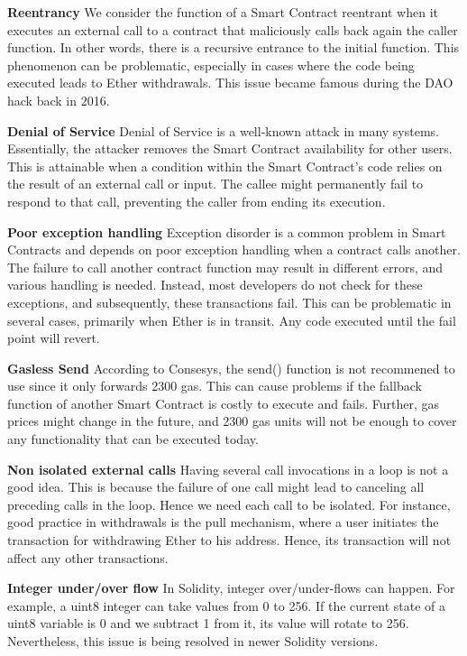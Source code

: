 \documentclass[a4paper,11pt]{article}
\begin{document}
\textbf{Reentrancy}
We consider the function of a Smart Contract reentrant when it executes an
external call to a contract that maliciously calls back again the caller
function. In other words, there is a recursive entrance to the initial function.
This phenomenon can be problematic, especially in cases where the code being
executed leads to Ether withdrawals. This issue became famous during the DAO\cite{dao}
hack back in 2016.

\textbf{Denial of Service}
Denial of Service is a well-known attack in many systems. Essentially, the
attacker removes the Smart Contract availability for other users. This is
attainable when a condition within the Smart Contract's code relies on the
result of an external call or input. The callee might permanently fail to
respond to that call, preventing the caller from ending its execution.

\textbf{Poor exception handling}
Exception disorder is a common problem in Smart Contracts and depends on poor
exception handling when a contract calls another. The failure to call another
contract function may result in different errors, and various handling is
needed. Instead, most developers do not check for these exceptions, and
subsequently, these transactions fail. This can be problematic in several cases,
primarily when Ether is in transit. Any code executed until the fail point
will revert.

\textbf{Gasless Send}
According to Consesys\cite{consensys_send}, the send() function is not recommened to use since it
only forwards 2300 gas. This can cause problems if the fallback function of
another Smart Contract is costly to execute and fails. Further, gas prices might
change in the future, and 2300 gas units will not be enough to cover any
functionality that can be executed today.

\textbf{Non isolated external calls}
Having several call invocations in a loop is not a good idea. This is because
the failure of one call might lead to canceling all preceding calls in the loop.
Hence we need each call to be isolated. For instance, good practice in
withdrawals is the pull mechanism\cite{consensys_send}, where a user initiates the transaction for
withdrawing Ether to his address. Hence, its transaction will not affect any
other transactions.

\textbf{Integer under/over flow}
In Solidity, integer over/under-flows can happen. For example, a uint8 integer
can take values from 0 to 256. If the current state of a uint8 variable is 0 and
we subtract 1 from it, its value will rotate to 256. Nevertheless, this issue is
being resolved in newer Solidity versions\cite{solidity8}.
\end{document}
